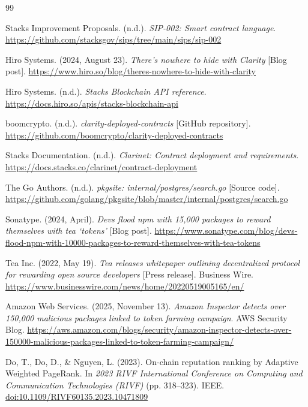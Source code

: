 \begingroup
\small
{}
\begin{thebibliography}{99}
\setlength{\itemsep}{0.25em}

 Stacks Improvement Proposals. (n.d.). \textit{SIP-002: Smart contract language}. \url{https://github.com/stacksgov/sips/tree/main/sips/sip-002}

 Hiro Systems. (2024, August 23). \textit{There's nowhere to hide with Clarity} [Blog post]. \url{https://www.hiro.so/blog/theres-nowhere-to-hide-with-clarity}

 Hiro Systems. (n.d.). \textit{Stacks Blockchain API reference}. \url{https://docs.hiro.so/apis/stacks-blockchain-api}

 boomcrypto. (n.d.). \textit{clarity-deployed-contracts} [GitHub repository]. \url{https://github.com/boomcrypto/clarity-deployed-contracts}

 Stacks Documentation. (n.d.). \textit{Clarinet: Contract deployment and requirements}. \url{https://docs.stacks.co/clarinet/contract-deployment}

 The Go Authors. (n.d.). \textit{pkgsite: internal/postgres/search.go} [Source code]. \url{https://github.com/golang/pkgsite/blob/master/internal/postgres/search.go}

 Sonatype. (2024, April). \textit{Devs flood npm with 15,000 packages to reward themselves with tea `tokens'} [Blog post]. \url{https://www.sonatype.com/blog/devs-flood-npm-with-10000-packages-to-reward-themselves-with-tea-tokens}

 Tea Inc. (2022, May 19). \textit{Tea releases whitepaper outlining decentralized protocol for rewarding open source developers} [Press release]. Business Wire. \url{https://www.businesswire.com/news/home/20220519005165/en/}

 Amazon Web Services. (2025, November 13). \textit{Amazon Inspector detects over 150,000 malicious packages linked to token farming campaign}. AWS Security Blog. \url{https://aws.amazon.com/blogs/security/amazon-inspector-detects-over-150000-malicious-packages-linked-to-token-farming-campaign/}

 Do, T., Do, D., \& Nguyen, L. (2023). On-chain reputation ranking by Adaptive Weighted PageRank. In \textit{2023 RIVF International Conference on Computing and Communication Technologies (RIVF)} (pp. 318--323). IEEE. \href{https://doi.org/10.1109/RIVF60135.2023.10471809}{doi:10.1109/RIVF60135.2023.10471809}


\end{thebibliography}
